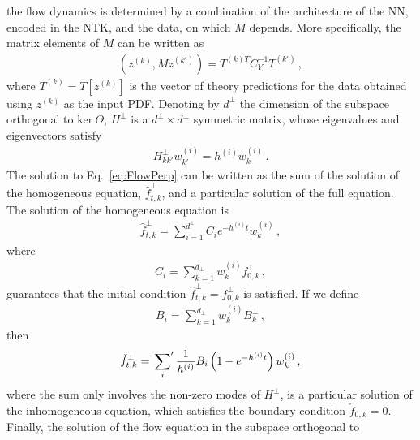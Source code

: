 \documentclass[11pt]{article}
\begin{document}
the flow dynamics is determined by a combination of the architecture of the NN, encoded in the NTK, and the 
data, on which $M$ depends. More specifically, the matrix elements of $M$ can be written as
\begin{align}
    \label{eq:MMatElems}
    \left(z^{(k)}, M z^{(k')}\right) = T^{(k)T} C_Y^{-1} T^{(k')}\, ,
\end{align} 
where $T^{(k)} = T[z^{(k)}]$ is the vector of theory predictions for the data obtained using $z^{(k)}$ as the 
input PDF. Denoting by $d^\perp$ the dimension of the subspace orthogonal to $\text{ker}\ \Theta$, $H^\perp$ is 
a $d^\perp\times d^\perp$ symmetric matrix, whose eigenvalues and eigenvectors satisfy
\begin{align}
    H^\perp_{kk'} w^{(i)}_{k'} = h^{(i)} w^{(i)}_{k}\, .
\end{align}
The solution to Eq.~\eqref{eq:FlowPerp} can be written as the sum of the solution of the 
homogeneous equation, $\hat{f}^{\perp}_{t,k}$, and a particular solution of the full equation. 
The solution of the homogeneous equation is
\begin{align}
    \label{eq:HomoSoln}
    \hat{f}^{\perp}_{t,k} = \sum_{i=1}^{d^\perp} C_i e^{-h^{(i)}t} w^{(i)}_k\, ,
\end{align}
where
\begin{align}
    \label{eq:InitialCi}
    C_i = \sum_{k=1}^{d_\perp} w^{(i)}_k f^\perp_{0,k}\, ,
\end{align}
guarantees that the initial condition $\hat{f}^\perp_{t,k}=f^\perp_{0,k}$ is 
satisfied. If we define
\begin{align}
    \label{eq:BiDef}
    B_i = \sum_{k=1}^{d_\perp} w^{(i)}_k B^\perp_{k}\, ,
\end{align}
then 
\begin{align}
    \label{eq:PartSol}
    \check{f}^\perp_{t,k} = \sideset{}{'}\sum_{i} \frac{1}{h^{(i)}} B_i 
        \left(1 - e^{-h^{(i)}t}\right) w^{(i)}_k\, ,
\end{align}
where the sum only involves the non-zero modes of $H^\perp$,
is a particular solution of the inhomogeneous equation, which satisfies the boundary 
condition $\check{f}_{0,k}=0$. Finally, the solution of the flow equation in the subspace orthogonal to 
\end{document}
